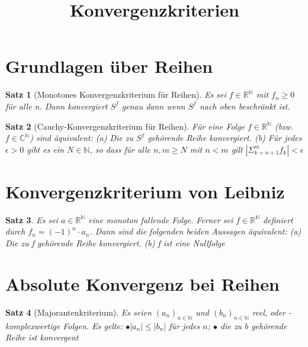 \documentclass[a4paper,12pt]{article}
\title{Konvergenzkriterien}
\newtheorem{theorem}{Satz}[section]
\begin{document}
\section{Grundlagen über Reihen}
\begin{theorem}[Monotones Konvergenzkriterium für Reihen]	

Es sei $f \in \mathbb{R}^{\mathbb{N}}$ mit $f_{n} \geq 0$ für alle n. Dann konvergiert $S^{f}$ genau dann wenn $S^{f}$ nach oben beschränkt ist.

\end{theorem}

\begin{theorem}[Cauchy-Konvergenzkriterium für Reihen]

Für eine Folge $f \in \mathbb{R}^{\mathbb{N}}$ (bzw. $f \in \mathbb{C}^{\mathbb{N}}$) sind äquivalent:
\newline
(a) Die zu  $S^{f}$ gehörende Reihe konvergiert.
\newline
(b) Für jedes $\epsilon > 0$ gibt es ein $N \in \mathbb{N}$, so dass für alle $n, m \geq N$ mit $n < m$ gilt $|\Sigma^{m}_{k = n+1} f_{k}| <  \epsilon$  
 
\end{theorem}

\section{Konvergenzkriterium von Leibniz}
\begin{theorem}
Es sei $a \in \mathbb{R}^{\mathbb{N}}$ eine monoton fallende Folge. Ferner sei
$f \in \mathbb{R}^{\mathbb{N}}$ definiert durch $f_n = (-1)^n\cdot a_n$. Dann sind die folgenden beiden Aussagen äquivalent:
\newline
(a) Die zu f gehörende Reihe konvergiert.
\newline
(b) f ist eine Nullfolge
\end{theorem}

\section{Absolute Konvergenz bei Reihen}
 \begin{theorem}[Majorantenkriterium]
 
 Es seien $(a_n)_{n \in \mathbb{N}}$ und $(b_n)_{n \in \mathbb{N}}$ reel, oder -komplexwertige Folgen. Es gelte:
\newline
$\bullet |a_n| \leq |b_n|$ für jedes $n$;
\newline
$\bullet$ die zu $b$ gehörende Reihe ist konvergent
 
\end{theorem}
 
\end{document}
